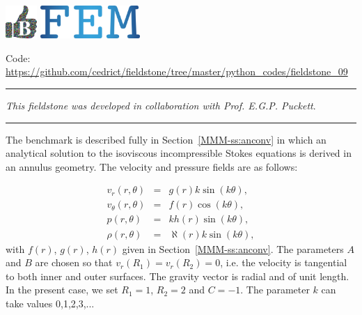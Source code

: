\includegraphics[height=1.25cm]{images/pictograms/benchmark}
\includegraphics[height=1.25cm]{images/pictograms/FEM}


%

\begin{center}
\inpython
{\small Code: \url{https://github.com/cedrict/fieldstone/tree/master/python_codes/fieldstone_09}}
\end{center}

\par\noindent\rule{\textwidth}{0.4pt}

{\sl This fieldstone was developed in collaboration with Prof. E.G.P. Puckett}. 

\par\noindent\rule{\textwidth}{0.4pt}

The benchmark is described fully in Section~\ref{MMM-ss:anconv} in which 
an analytical solution to the isoviscous incompressible Stokes equations 
is derived in an annulus geometry. The velocity and pressure fields are as follows:

\begin{eqnarray}
v_r(r,\theta)      &=&  g(r) k \sin(k\theta), \\
v_\theta(r,\theta) &=&  f(r) \cos(k \theta), \\ 
p(r,\theta)        &=&  k h(r) \sin(k \theta), \\
\rho (r,\theta)    &=& \aleph(r) k \sin (k \theta), 
\end{eqnarray}
with $f(r)$, $g(r)$, $h(r)$ given in Section~\ref{MMM-ss:anconv}.
The parameters $A$ and $B$ are chosen so that $v_r(R_1)=v_r(R_2)=0$, i.e.
the velocity is tangential to both inner and outer surfaces.
The gravity vector is radial and of unit length.
In the present case, we set $R_1=1$, $R_2=2$ and $C=-1$.
The parameter $k$ can take values 0,1,2,3,... 

